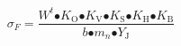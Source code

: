 \begin{equation}
{\sigma }_F\mathrm{=}\frac{W^t\mathrm{\bullet }K_{\mathrm{O}}\mathrm{\bullet }K_{\mathrm{V}}\mathrm{\bullet }K_{\mathrm{S}}\mathrm{\bullet }K_{\mathrm{H}}\mathrm{\bullet }K_{\mathrm{B}}}{b\mathrm{\bullet }m_n\mathrm{\bullet }Y_{\mathrm{J}}}
\end{equation}
